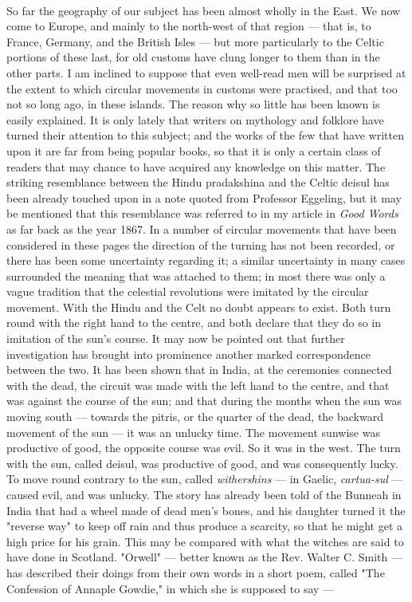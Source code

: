 \documentclass[a4paper, 11pt, oneside, polutonikogreek, english]{article}
\begin{document}
\paragraph{}
So far the geography of our subject has been almost wholly in the East. We now come to Europe, and mainly to the north-west of that region --- that is, to France, Germany, and the British Isles --- but more particularly to the Celtic portions of these last, for old customs have clung longer to them than in the other parts. I am inclined to suppose that even well-read men will be surprised at the extent to which circular movements in customs were practised, and that too not so long ago, in these islands. The reason why so little has been known is easily explained. It is only lately that writers on mythology and folklore have turned their attention to this subject; and the works of the few that have written upon it are far from being popular books, so that it is only a certain class of readers that may chance to have acquired any knowledge on this matter. The striking resemblance between the Hindu pradakshina and the Celtic deisul has been already touched upon in a note quoted from Professor Eggeling, but it may be mentioned that this resemblance was referred to in my article in \emph{Good Words} as far back as the year 1867. In a number of circular movements that have been considered in these pages the direction of the turning has not been recorded, or there has been some uncertainty regarding it; a similar uncertainty in many cases surrounded the meaning that was attached to them; in most there was only a vague tradition that the celestial revolutions were imitated by the circular movement. With the Hindu and the Celt no doubt appears to exist. Both turn round with the right hand to the centre, and both declare that they do so in imitation of the sun's course. It may now be pointed out that further investigation has brought into prominence another marked correspondence between the two. It has been shown that in India, at the ceremonies connected with the dead, the circuit was made with the left hand to the centre, and that was against the course of the sun; and that during the months when the sun was moving south --- towards the pitris, or the quarter of the dead, the backward movement of the sun --- it was an unlucky time. The movement sunwise was productive of good, the opposite course was evil. So it was in the west. The turn with the sun, called deisul, was productive of good, and was consequently lucky. To move round contrary to the sun, called \emph{withershins} --- in Gaelic, \emph{cartua-sul} --- caused evil, and was unlucky. The story has already been told of the Bunneah in India that had a wheel made of dead men's bones, and his daughter turned it the "reverse way" to keep off rain and thus produce a scarcity, so that he might get a high price for his grain. This may be compared with what the witches are said to have done in Scotland. "Orwell" --- better known as the Rev. Walter C. Smith --- has described their doings from their own words in a short poem, called "The Confession of Annaple Gowdie," in which she is supposed to say ---
\end{document}
